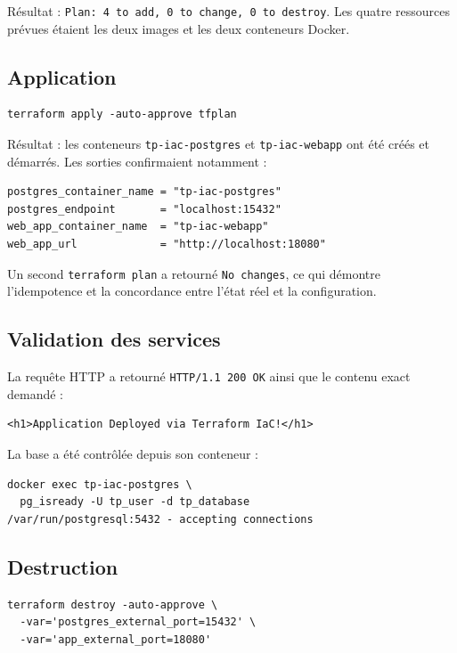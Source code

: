 \documentclass[11pt,a4paper]{article}
\begin{document}
Résultat : \texttt{Plan: 4 to add, 0 to change, 0 to destroy}. Les quatre ressources
prévues étaient les deux images et les deux conteneurs Docker.

\subsection{Application}

\begin{lstlisting}
terraform apply -auto-approve tfplan
\end{lstlisting}

Résultat : les conteneurs \texttt{tp-iac-postgres} et \texttt{tp-iac-webapp} ont été
créés et démarrés. Les sorties confirmaient notamment :

\begin{lstlisting}
postgres_container_name = "tp-iac-postgres"
postgres_endpoint       = "localhost:15432"
web_app_container_name  = "tp-iac-webapp"
web_app_url             = "http://localhost:18080"
\end{lstlisting}

Un second \texttt{terraform plan} a retourné \texttt{No changes}, ce qui démontre
l'idempotence et la concordance entre l'état réel et la configuration.

\subsection{Validation des services}

La requête HTTP a retourné \texttt{HTTP/1.1 200 OK} ainsi que le contenu exact demandé :

\begin{lstlisting}
<h1>Application Deployed via Terraform IaC!</h1>
\end{lstlisting}

La base a été contrôlée depuis son conteneur :

\begin{lstlisting}
docker exec tp-iac-postgres \
  pg_isready -U tp_user -d tp_database
/var/run/postgresql:5432 - accepting connections
\end{lstlisting}

\subsection{Destruction}

\begin{lstlisting}
terraform destroy -auto-approve \
  -var='postgres_external_port=15432' \
  -var='app_external_port=18080'
\end{lstlisting}
\end{document}
